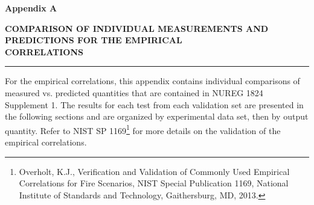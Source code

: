 \documentclass[12pt, titlepage, twoside]{article}
\begin{document}
\thispagestyle{empty}

\huge
\noindent \textbf{Appendix A}

\vspace{0.5em}
\LARGE
\noindent \textbf{COMPARISON OF INDIVIDUAL MEASUREMENTS AND PREDICTIONS FOR THE EMPIRICAL \\ CORRELATIONS}

\normalsize

\vspace{1.5em}
\hrule
\vspace{1.0em}

For the empirical correlations, this appendix contains individual comparisons of measured vs. predicted quantities that are contained in NUREG 1824 Supplement 1. The results for each test from each validation set are presented in the following sections and are organized by experimental data set, then by output quantity. Refer to NIST SP 1169\footnote{Overholt, K.J., Verification and Validation of Commonly Used Empirical Correlations for Fire Scenarios, NIST Special Publication 1169, National Institute of Standards and Technology, Gaithersburg, MD, 2013.} for more details on the validation of the empirical correlations.

\clearpage
{}
\thispagestyle{empty}
\tableofcontents

\appendix

\setcounter{section}{0}


\end{document}
